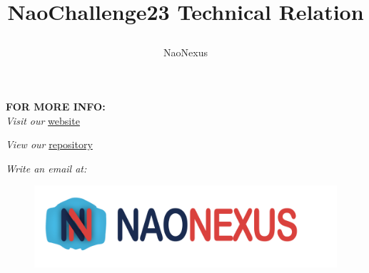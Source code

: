 \documentclass{optica-article}
\begin{document}
\title{ \begin{huge}
\textbf{NaoChallenge23 Technical Relation} 
\end{huge} }

\author{\centering NaoNexus}

\noindent
\textbf{FOR MORE INFO:} \\

\noindent\textit{Visit our} \href{https://www.naonexus.altervista.org/naochallenge2023/index.html}{website}



\noindent \textit{View our} \href{https://github.com/NaoNexus/ChallengeNao23}{repository}

\noindent\textit{Write an email at: }

\bigskip

\begin{figure}
    \centering
    \includegraphics[scale=0.05]{figures/logo.png}
    \label{fig:logo_con_scritta}
\end{figure}

\tableofcontents

\vspace{10pt}

\newpage
\end{document}

